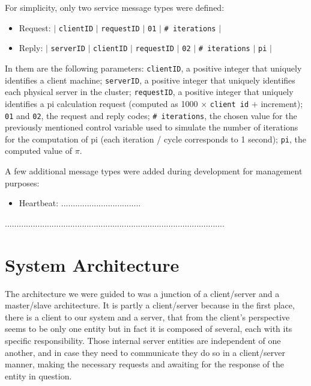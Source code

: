 \documentclass[12pt]{article}
\begin{document}
For simplicity, only two service message types were defined:
\vspace{-10pt}
\begin{itemize}[noitemsep]
  \item Request: $|$ \texttt{clientID} $|$ \texttt{requestID} $|$ \texttt{01} $|$ \texttt{\# iterations} $|$
  \item Reply: $|$ \texttt{serverID} $|$ \texttt{clientID} $|$ \texttt{requestID} $|$ \texttt{02} $|$ \texttt{\# iterations} $|$ \texttt{pi} $|$
\end{itemize}
\vspace{-10pt}
In them are the following parameters:
\texttt{clientID}, a positive integer that uniquely identifies a client machine;
\texttt{serverID}, a positive integer that uniquely identifies each physical server in the cluster;
\texttt{requestID}, a positive integer that uniquely identifies a pi calculation request (computed as 1000 $\times$ \texttt{client id} $+$ increment);
\texttt{01} and \texttt{02}, the request and reply codes;
\texttt{\# iterations}, the chosen value for the previously mentioned control variable used to simulate the number of iterations for the computation of pi
(each iteration / cycle corresponds to 1 second);
\texttt{pi}, the computed value of $\pi$.

A few additional message types were added during development for management purposes:
\vspace{-10pt}
\begin{itemize}[noitemsep]
  \item Heartbeat: ..................................
\end{itemize}
\vspace{-10pt}

..............................................................................................

\newpage
\section{System Architecture} \label{architecture} %
The architecture we were guided to was a junction of a client/server and a master/slave architecture. It is partly a client/server because in the first place, there is a client to our system and a server, that from the client's perspective seems to be only one entity but in fact it is composed of several, each with its specific responsibility. Those internal server entities are independent of one another, and in case they need to communicate they do so in a client/server manner, making the necessary requests and awaiting for the response of the entity in question.
\end{document}
